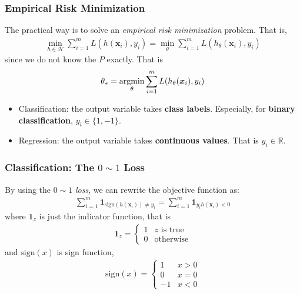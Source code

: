 \subsubsection{Empirical Risk Minimization}
The practical way is to solve an \textit{empirical risk minimization} problem. That is,
\begin{align*}
    \min_{h\in \mathcal{H}}\sum_{i=1}^m L(h(\bm x_i), y_i)=\min_\theta \sum_{i=1}^m L(h_\theta(\bm x_i), y_i)
\end{align*}
since we do not know the $P$ exactly. That is
\begin{align*}
    \theta_*=\operatorname*{argmin}_\theta \sum_{i=1}^m L(h_\theta(\bm x_i), y_i)
\end{align*}

\begin{itemize}
    \item Classification: the output variable takes \textbf{class labels}. Especially, for \textbf{binary classification}, $y_i\in\{1,-1\}$. 
    \item Regression: the output variable takes \textbf{continuous values}. That is $y_i \in\mathbb{R}$. 
\end{itemize}

\subsubsection{Classification: \texorpdfstring{The $0\sim 1$ Loss}.} 
By using the $0\sim1$ \textit{loss}, we can rewrite the objective function as:
\begin{align*}
    \sum_{i=1}^m \bm 1_{\mathrm{sign}(h(\bm x_i))\ne y_i}=\sum_{i=1}^m\bm 1_{y_ih(\bm x_i)<0}
\end{align*}
where $\bm 1_z$ is just the indicator function, that is
\begin{align*}
    \bm 1_z=\left\{ \begin{array}{ll}
        1 & z\text{ is true}\\
        0 & \text{otherwise}
    \end{array} \right.
\end{align*}
and $\mathrm{sign}(x)$ is sign function,
\begin{align*}
    \mathrm{sign}(x)=\left\{ \begin{array}{ll}
        1 & x>0\\
        0 & x=0\\
        -1 & x<0
    \end{array} \right.
\end{align*}

